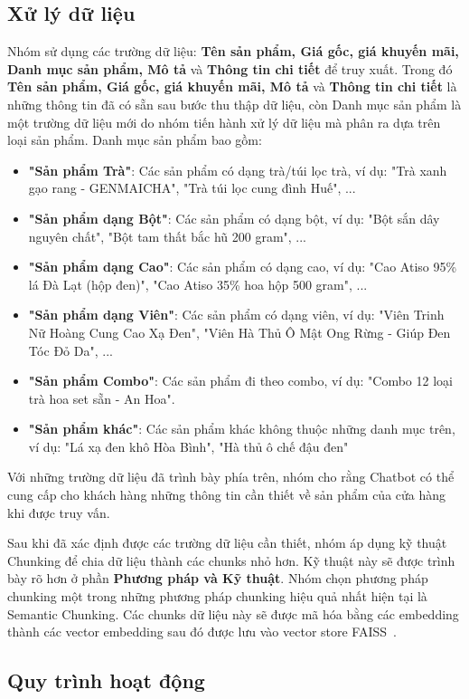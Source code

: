 \documentclass{article}
\numberwithin{equation}{section}
\numberwithin{equation}{section}
\begin{document}
\subsection{Xử lý dữ liệu}
Nhóm sử dụng các trường dữ liệu: \textbf{Tên sản phẩm, Giá gốc, giá khuyến mãi, Danh mục sản phẩm, Mô tả} và \textbf{Thông tin chi tiết} để truy xuất. Trong đó \textbf{Tên sản phẩm, Giá gốc, giá khuyến mãi, Mô tả} và \textbf{Thông tin chi tiết} là những thông tin đã có sẵn sau bước thu thập dữ liệu, còn Danh mục sản phẩm là một trường dữ liệu mới do nhóm tiến hành xử lý dữ liệu mà phân ra dựa trên loại sản phẩm. Danh mục sản phẩm bao gồm: 
\begin{itemize}[-]
    \item \textbf{"Sản phẩm Trà"}: Các sản phẩm có dạng trà/túi lọc trà, ví dụ: "Trà xanh gạo rang - GENMAICHA", "Trà túi lọc cung đình Huế", ...
    \item \textbf{"Sản phẩm dạng Bột"}: Các sản phẩm có dạng bột, ví dụ: "Bột sắn dây nguyên chất", "Bột tam thất bắc hũ 200 gram", ...
    \item \textbf{"Sản phẩm dạng Cao"}: Các sản phẩm có dạng cao, ví dụ: "Cao Atiso 95\% lá Đà Lạt (hộp đen)",  "Cao Atiso 35\% hoa hộp 500 gram", ...
    \item \textbf{"Sản phẩm dạng Viên"}: Các sản phẩm có dạng viên, ví dụ: "Viên Trinh Nữ Hoàng Cung Cao Xạ Đen", "Viên Hà Thủ Ô Mật Ong Rừng - Giúp Đen Tóc Đỏ Da", ...
    \item \textbf{"Sản phẩm Combo"}: Các sản phẩm đi theo combo, ví dụ: "Combo 12 loại trà hoa set sẵn - An Hoa".
    \item \textbf{"Sản phẩm khác"}: Các sản phẩm khác không thuộc những danh mục trên, ví dụ: "Lá xạ đen khô Hòa Bình", "Hà thủ ô chế đậu đen"
\end{itemize}

Với những trường dữ liệu đã trình bày phía trên, nhóm cho rằng Chatbot có thể cung cấp cho khách hàng những thông tin cần thiết về sản phẩm của cửa hàng khi được truy vấn. 

Sau khi đã xác định được các trường dữ liệu cần thiết, nhóm áp dụng kỹ thuật Chunking để chia dữ liệu thành các chunks nhỏ hơn. Kỹ thuật này sẽ được trình bày rõ hơn ở phần \textbf{Phương pháp và Kỹ thuật}. Nhóm chọn phương pháp chunking một trong những phương pháp chunking hiệu quả nhất hiện tại là Semantic Chunking. Các chunks dữ liệu này sẽ được mã hóa bằng các embedding thành các vector embedding sau đó được lưu vào vector store FAISS~\cite{douze2024faisslibrary}.
\subsection{Quy trình hoạt động}
\end{document}
